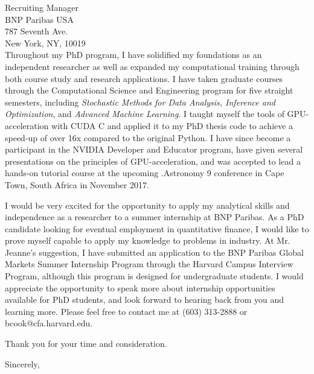 \documentclass{letter}
\begin{document}
\begin{letter}{Recruiting Manager\\
BNP Paribas USA\\
787 Seventh Ave.\\
New York, NY, 10019\\
}
\noindent Throughout my PhD program, I have solidified my foundations
as an independent researcher as well as expanded my computational
training through both course study and research applications. I have
taken graduate courses through the Computational Science and
Engineering program for five straight semesters, including
\textit{Stochastic Methods for Data Analysis, Inference and
  Optimization}, and \textit{Advanced Machine Learning}. I taught
myself the tools of GPU-acceleration with CUDA C and applied it to my
PhD thesis code to achieve a speed-up of over 16x compared to the
original Python. I have since become a participant in the NVIDIA
Developer and Educator program, have given several presentations on
the principles of GPU-acceleration, and was accepted to lead a
hands-on tutorial course at the upcoming .Astronomy 9 conference in
Cape Town, South Africa in November 2017.

\noindent I would be very excited for the opportunity to apply my
analytical skills and independence as a researcher to a summer
internship at BNP Paribas. As a PhD candidate looking for eventual
employment in quantitative finance, I would like to prove myself
capable to apply my knowledge to problems in industry. At Mr. Jeanne's
suggestion, I have submitted an application to the BNP Paribas Global
Markets Summer Internship Program through the Harvard Campus Interview
Program, although this program is designed for undergraduate students.
I would appreciate the opportunity to speak more about internship
opportunities available for PhD students, and look forward to hearing
back from you and learning more. Please feel free to contact me at
(603) 313-2888 or bcook@cfa.harvard.edu.

Thank you for your time and consideration.


\closing{Sincerely,}


\end{letter}
\end{document}
